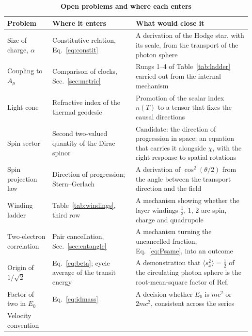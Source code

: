 \documentclass[%
 reprint, amsmath,amssymb, aps, prb, ]{revtex4-2}
\numberwithin{equation}{section}
\begin{document}
\begin{table}[t!]
\centering
\caption{\textbf{Open problems and where each enters}}
\label{tab:open}
\renewcommand{\arraystretch}{1.25}
\begin{tabular}{p{3.6cm}p{4.6cm}p{6.8cm}}
\toprule
\textbf{Problem} & \textbf{Where it enters} & \textbf{What would close it} \\
\midrule
Size of charge, $\alpha$
& Constitutive relation, Eq.~\eqref{eq:constit}
& A derivation of the Hodge star, with its scale, from the transport of the photon sphere \\
\addlinespace[0.15cm]
Coupling to $A_\mu$
& Comparison of clocks, Sec.~\ref{sec:metric}
& Rungs 1--4 of Table~\ref{tab:ladder} carried out from the internal mechanism \\
\addlinespace[0.15cm]
Light cone
& Refractive index of the thermal geodesic
& Promotion of the scalar index $n(T)$ to a tensor that fixes the causal directions \\
\addlinespace[0.15cm]
Spin sector
& Second two-valued quantity of the Dirac spinor
& Candidate: the direction of progression in space; an equation that carries it alongside $\chi$, with the right response to spatial rotations \\
\addlinespace[0.15cm]
Spin projection law
& Direction of progression; Stern--Gerlach
& A derivation of $\cos^2(\theta/2)$ from the angle between the transport direction and the field \\
\addlinespace[0.15cm]
Winding ladder
& Table~\ref{tab:windings}, third row
& A mechanism showing whether the layer windings $\tfrac12$, $1$, $2$ are spin, charge and quadrupole \\
\addlinespace[0.15cm]
Two-electron correlation
& Pair cancellation, Sec.~\ref{sec:entangle}
& A mechanism turning the uncancelled fraction, Eq.~\eqref{eq:Psame}, into an outcome \\
\addlinespace[0.15cm]
Origin of $1/\sqrt2$
& Eq.~\eqref{eq:beta}; cycle average of the transit energy
& A demonstration that $\langle s_x^2\rangle=\tfrac12$ of the circulating photon sphere is the root-mean-square factor of Ref.~\cite{ref:p62} \\
\addlinespace[0.15cm]
Factor of two in $E_0$
& Eq.~\eqref{eq:idmass}
& A decision whether $E_0$ is $mc^2$ or $2mc^2$, consistent across the series \\
\addlinespace[0.15cm]
Velocity convention

\end{tabular}
\end{table}
\end{document}
